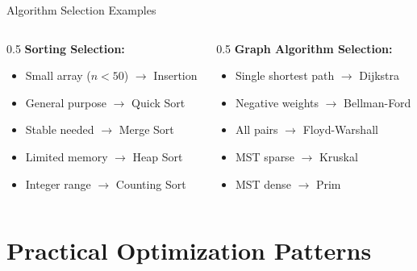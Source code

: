 \documentclass[aspectratio=169,xcolor=dvipsnames]{beamer}
\begin{document}
\begin{frame}{Algorithm Selection Examples}
  \begin{columns}
    \begin{column}{0.5\textwidth}
      \textbf{Sorting Selection:}
      \begin{itemize}
        \item Small array ($n < 50$) $\to$ Insertion
        \item General purpose $\to$ Quick Sort
        \item Stable needed $\to$ Merge Sort
        \item Limited memory $\to$ Heap Sort
        \item Integer range $\to$ Counting Sort
      \end{itemize}
    \end{column}

    \begin{column}{0.5\textwidth}
      \textbf{Graph Algorithm Selection:}
      \begin{itemize}
        \item Single shortest path $\to$ Dijkstra
        \item Negative weights $\to$ Bellman-Ford
        \item All pairs $\to$ Floyd-Warshall
        \item MST sparse $\to$ Kruskal
        \item MST dense $\to$ Prim
      \end{itemize}
    \end{column}
  \end{columns}
\end{frame}

\section{Practical Optimization Patterns}
\end{document}
